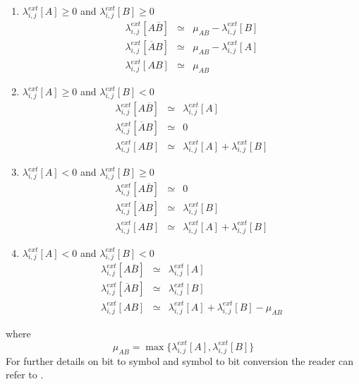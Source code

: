 \documentclass[10pt,twocolumn,journal]{IEEEtran}
\begin{document}
\begin{enumerate}
\item $\lambda^{ext}_{i,j}[A] \ge 0$ and $\lambda^{ext}_{i,j}[B] \ge 0$
\begin{eqnarray}
\lambda^{ext}_{i,j}[A\overline{B}] & \simeq & \mu_{AB} - \lambda^{ext}_{i,j}[B] \\
\lambda^{ext}_{i,j}[\overline{A}B] & \simeq & \mu_{AB} - \lambda^{ext}_{i,j}[A] \\
\lambda^{ext}_{i,j}[AB]            & \simeq & \mu_{AB}
\end{eqnarray}
\item $\lambda^{ext}_{i,j}[A] \ge 0$ and $\lambda^{ext}_{i,j}[B] < 0$
\begin{eqnarray}
  \lambda^{ext}_{i,j}[A\overline{B}] & \simeq & \lambda^{ext}_{i,j}[A] \\
  \lambda^{ext}_{i,j}[\overline{A}B] & \simeq & 0 \\
  \lambda^{ext}_{i,j}[AB]            & \simeq & \lambda^{ext}_{i,j}[A]+\lambda^{ext}_{i,j}[B] 
\end{eqnarray}
\item $\lambda^{ext}_{i,j}[A] < 0$ and $\lambda^{ext}_{i,j}[B] \ge 0$
\begin{eqnarray}
  \lambda^{ext}_{i,j}[A\overline{B}] & \simeq & 0 \\
  \lambda^{ext}_{i,j}[\overline{A}B] & \simeq & \lambda^{ext}_{i,j}[B] \\
  \lambda^{ext}_{i,j}[AB]            & \simeq & \lambda^{ext}_{i,j}[A]+\lambda^{ext}_{i,j}[B]
\end{eqnarray}
\item $\lambda^{ext}_{i,j}[A] < 0$ and $\lambda^{ext}_{i,j}[B] < 0$
\begin{eqnarray}
  \lambda^{ext}_{i,j}[A\overline{B}] & \simeq & \lambda^{ext}_{i,j}[A] \\
  \lambda^{ext}_{i,j}[\overline{A}B] & \simeq & \lambda^{ext}_{i,j}[B] \\
  \lambda^{ext}_{i,j}[AB]            & \simeq & \lambda^{ext}_{i,j}[A]+\lambda^{ext}_{i,j}[B] - \mu_{AB}
\end{eqnarray}
\end{enumerate}
where 
\begin{equation}
\mu_{AB} = \max \{\lambda^{ext}_{i,j}[A], \lambda^{ext}_{i,j}[B]\}
\end{equation}
For further details on bit to symbol and symbol to bit conversion the reader can refer to \cite{kim_TCASII09}.
\end{document}
